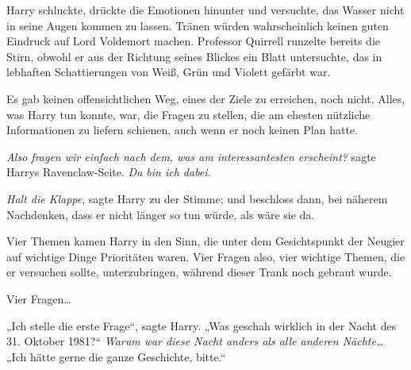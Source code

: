 Harry schluckte, drückte die Emotionen hinunter und versuchte, das Wasser nicht in seine Augen kommen zu lassen. Tränen würden wahrscheinlich keinen guten Eindruck auf Lord Voldemort machen. Professor Quirrell runzelte bereits die Stirn, obwohl er aus der Richtung seines Blickes ein Blatt untersuchte, das in lebhaften Schattierungen von Weiß, Grün und Violett gefärbt war.

Es gab keinen offensichtlichen Weg, eines der Ziele zu erreichen, noch nicht. Alles, was Harry tun konnte, war, die Fragen zu stellen, die am ehesten nützliche Informationen zu liefern schienen, auch wenn er noch keinen Plan hatte.

\emph{Also fragen wir einfach nach dem, was am interessantesten erscheint?} sagte Harrys Ravenclaw-Seite. \emph{Da bin ich dabei.}

\emph{Halt die Klappe}, sagte Harry zu der Stimme; und beschloss dann, bei näherem Nachdenken, dass er nicht länger so tun würde, als wäre sie da.

Vier Themen kamen Harry in den Sinn, die unter dem Gesichtspunkt der Neugier auf wichtige Dinge Prioritäten waren. Vier Fragen also, vier wichtige Themen, die er versuchen sollte, unterzubringen, während dieser Trank noch gebraut wurde.

Vier Fragen…

„Ich stelle die erste Frage“, sagte Harry. „Was geschah wirklich in der Nacht des 31. Oktober 1981?“
\emph{Warum war diese Nacht anders als alle anderen Nächte…}
„Ich hätte gerne die ganze Geschichte, bitte.“

